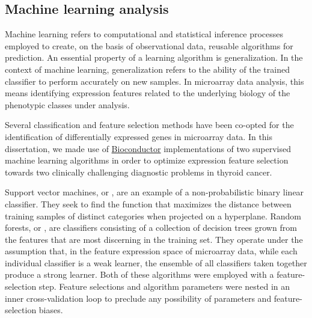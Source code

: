 

\subsection{Machine learning analysis}
\label{sec:methods-machine-learning}
Machine learning refers to computational and statistical inference processes
employed to create, on the basis of observational data, reusable algorithms for
prediction.\cite{gentleman_bioinformatics_2006} An essential property of a
learning algorithm is generalization.  In the context of machine learning,
generalization refers to the ability of the trained classifier to perform
accurately on new samples.  In microarray data analysis, this means identifying
expression features related to the underlying biology of the phenotypic classes
under analysis.

Several classification and feature selection methods have been co-opted for the
identification of differentially expressed genes in microarray
data.\cite{pirooznia_comparative_2008} In this dissertation, we made use of
\href{http://www.bioconductor.org/}{\textsf{Bioconductor}} implementations of
two supervised machine learning algorithms in order to optimize expression
feature selection towards two clinically challenging diagnostic problems in
thyroid cancer.

Support vector machines, or , are an example of a
non-probabilistic binary linear classifier.  They seek to find the function that
maximizes the distance between training samples of distinct categories when
projected on a hyperplane.\cite{cortes_support-vector_1995} Random forests, or
, are classifiers consisting of a collection of decision trees
grown from the features that are most discerning in the training
set.\cite{breiman_random_2001} They operate under the assumption that, in the
feature expression space of microarray data, while each individual classifier is
a weak learner, the ensemble of all classifiers taken together produce a strong
learner.  Both of these algorithms were employed with a feature-selection step.
Feature selections and algorithm parameters were nested in an inner
cross-validation loop to preclude any possibility of parameters and
feature-selection biases.

